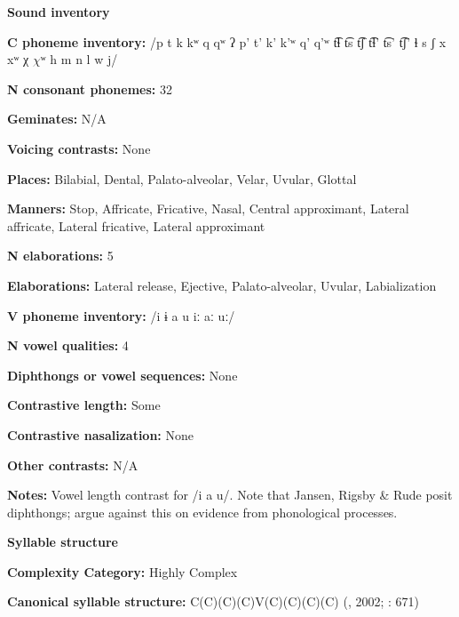 \textbf{Sound inventory}



\textbf{C phoneme inventory:} /p t k kʷ q qʷ ʔ p’ t’ k’ k’ʷ q’ q’ʷ t͡ɬ t͡s t͡ʃ t͡ɬ’ t͡s’ t͡ʃ’ ɬ s ʃ x xʷ χ $\chi ʷ$ h m n l w j/



\textbf{N consonant phonemes:} 32



\textbf{Geminates:} N/A



\textbf{Voicing contrasts:} None



\textbf{Places:} Bilabial, Dental, Palato-alveolar, Velar, Uvular, Glottal



\textbf{Manners:} Stop, Affricate, Fricative, Nasal, Central approximant, Lateral affricate, Lateral fricative, Lateral approximant



\textbf{N elaborations:} 5



\textbf{Elaborations:} Lateral release, Ejective, Palato-alveolar, Uvular, Labialization



\textbf{V phoneme inventory:} /i ɨ a u iː aː uː/



\textbf{N vowel qualities:} 4



\textbf{Diphthongs or vowel sequences:} None



\textbf{Contrastive length:} Some



\textbf{Contrastive nasalization:} None



\textbf{Other contrasts:} N/A



\textbf{Notes:} Vowel length contrast for /i a u/. Note that Jansen, Rigsby \& Rude posit diphthongs; \citet{HargusBeavert2006} argue against this on evidence from phonological processes.



\textbf{Syllable structure}



\textbf{Complexity Category:} Highly Complex



\textbf{Canonical syllable structure:} C(C)(C)(C)V(C)(C)(C)(C) (\citealt{HargusBeavert2006}, 2002; \citealt{RigsbyRude1996}: 671)



